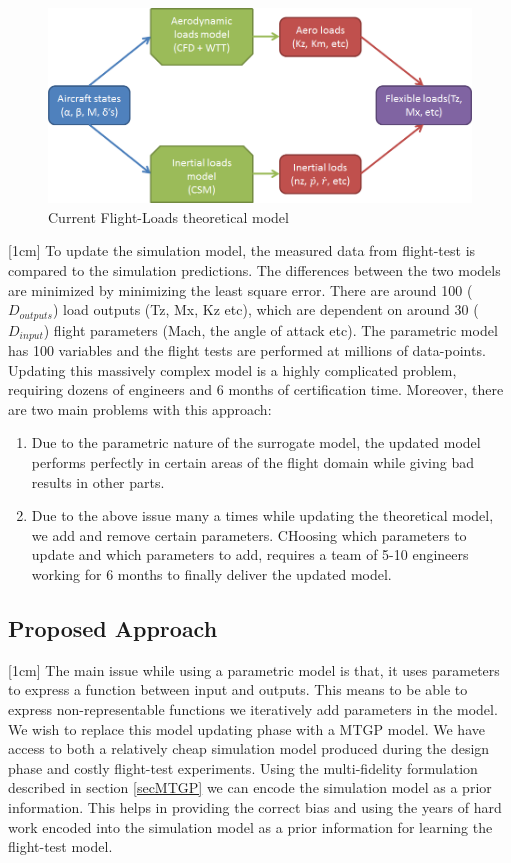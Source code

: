 \begin{figure}[ht!]
 \centering
 \includegraphics[width=\textwidth]{images/part3/flightLoadsModel}
 \caption{Current Flight-Loads theoretical model}
 \label{fig:currentFlightLoadsIdentificationApproach}
\end{figure}

[1cm]
To update the simulation model, the measured data from flight-test is compared to the simulation predictions. The differences between the two models are minimized by minimizing the least square error. There are around 100 ($D_{outputs}$) load outputs (Tz, Mx, Kz etc), which are dependent on around 30 ($D_{input}$) flight parameters (Mach, the angle of attack etc). The parametric model has 100 variables and the flight tests are performed at millions of data-points. Updating this massively complex model is a highly complicated problem, requiring dozens of engineers and 6 months of certification time. Moreover, there are two main problems with this approach: 


\begin{enumerate}
\item Due to the parametric nature of the surrogate model, the updated model performs perfectly in certain areas of the flight domain while giving bad results in other parts. 
\item Due to the above issue many a times while updating the theoretical model, we add and remove certain parameters. CHoosing which parameters to update and which parameters to add, requires a team of 5-10 engineers working for 6 months to finally deliver the updated model.
\end{enumerate}

\subsection{Proposed Approach}
[1cm]
The main issue while using a parametric model is that, it uses parameters to express a function between input and outputs. This means to be able to express non-representable functions we iteratively add parameters in the model. We wish to replace this model updating phase with a MTGP model. We have access to both a relatively cheap simulation model produced during the design phase and costly flight-test experiments. Using the multi-fidelity formulation described in section \ref{secMTGP} we can encode the simulation model as a prior information. This helps in providing the correct bias and using the years of hard work encoded into the simulation model as a prior information for learning the flight-test model.

